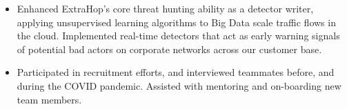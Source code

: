 \documentclass[10pt]{article}
\newcommand{\tabularxwidth}{\textwidth}
\begin{document}
\begin{minipage}{\tabularxwidth}
\begin{itemize}[noitemsep, topsep=3pt, parsep=0pt, partopsep=0pt]
                \item 
    Enhanced ExtraHop's core threat hunting ability as a detector writer, applying unsupervised learning algorithms to Big Data scale traffic flows in the cloud. Implemented real-time detectors that act as early warning signals of potential bad actors on corporate networks across our customer base.
            
                \item 
    Participated in recruitment efforts, and interviewed teammates before, and during the COVID pandemic. Assisted with mentoring and on-boarding new team members.
            
        \end{itemize}

        
            \vspace{.3em}
        

    \end{minipage}
    
\end{document}

